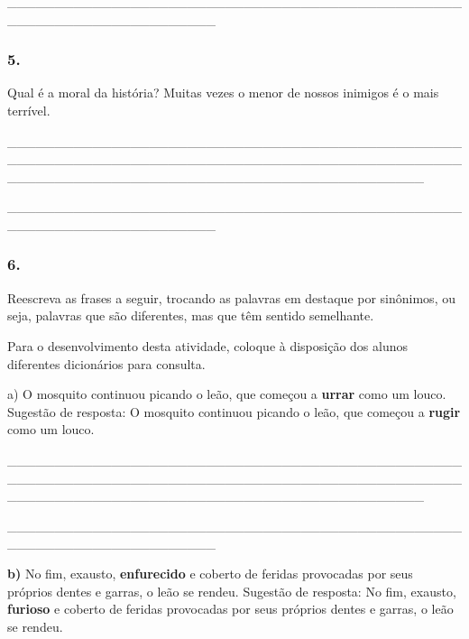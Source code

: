 \_\_\_\_\_\_\_\_\_\_\_\_\_\_\_\_\_\_\_\_\_\_\_\_\_\_\_\_\_\_\_\_\_\_\_\_\_\_\_\_\_\_\_\_\_\_\_\_\_\_\_\_\_\_\_\_\_\_\_\_\_\_\_\_\_\_\_\_\_\_

\subsubsection{5. }\label{section-4}

Qual é a moral da história? Muitas vezes o menor de nossos inimigos é o
mais terrível.

\_\_\_\_\_\_\_\_\_\_\_\_\_\_\_\_\_\_\_\_\_\_\_\_\_\_\_\_\_\_\_\_\_\_\_\_\_\_\_\_\_\_\_\_\_\_\_\_\_\_\_\_\_\_\_\_\_\_\_\_\_\_\_\_\_\_\_\_\_\_\_\_\_\_\_\_\_\_\_\_\_\_\_\_\_\_\_\_\_\_\_\_\_\_\_\_\_\_\_\_\_\_\_\_\_\_\_\_\_\_\_\_\_\_\_\_\_\_\_\_\_\_\_\_\_\_\_\_\_\_\_\_\_\_\_\_\_\_\_\_

\_\_\_\_\_\_\_\_\_\_\_\_\_\_\_\_\_\_\_\_\_\_\_\_\_\_\_\_\_\_\_\_\_\_\_\_\_\_\_\_\_\_\_\_\_\_\_\_\_\_\_\_\_\_\_\_\_\_\_\_\_\_\_\_\_\_\_\_\_\_

\subsubsection{6. }\label{section-5}

Reescreva as frases a seguir, trocando as palavras em destaque por
sinônimos, ou seja, palavras que são diferentes, mas que têm sentido
semelhante.

Para o desenvolvimento desta atividade, coloque à disposição dos alunos
diferentes dicionários para consulta.

a) O mosquito continuou picando o leão, que começou a \textbf{urrar}
como um louco. \protect\hypertarget{_Hlk127196857}{}{}Sugestão de
resposta: O mosquito continuou picando o leão, que começou a
\textbf{rugir} como um louco.

\_\_\_\_\_\_\_\_\_\_\_\_\_\_\_\_\_\_\_\_\_\_\_\_\_\_\_\_\_\_\_\_\_\_\_\_\_\_\_\_\_\_\_\_\_\_\_\_\_\_\_\_\_\_\_\_\_\_\_\_\_\_\_\_\_\_\_\_\_\_\_\_\_\_\_\_\_\_\_\_\_\_\_\_\_\_\_\_\_\_\_\_\_\_\_\_\_\_\_\_\_\_\_\_\_\_\_\_\_\_\_\_\_\_\_\_\_\_\_\_\_\_\_\_\_\_\_\_\_\_\_\_\_\_\_\_\_\_\_\_

\_\_\_\_\_\_\_\_\_\_\_\_\_\_\_\_\_\_\_\_\_\_\_\_\_\_\_\_\_\_\_\_\_\_\_\_\_\_\_\_\_\_\_\_\_\_\_\_\_\_\_\_\_\_\_\_\_\_\_\_\_\_\_\_\_\_\_\_\_\_

\textbf{b)} \protect\hypertarget{_Hlk127196878}{}{}No fim, exausto,
\textbf{enfurecido} e coberto de feridas provocadas por seus próprios
dentes e garras, o leão se rendeu. Sugestão de resposta: No fim,
exausto, \textbf{furioso} e coberto de feridas provocadas por seus
próprios dentes e garras, o leão se rendeu.

